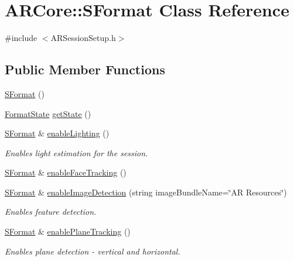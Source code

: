 \hypertarget{class_a_r_core_1_1_s_format}{}\section{A\+R\+Core\+:\+:S\+Format Class Reference}
\label{class_a_r_core_1_1_s_format}


{\ttfamily \#include $<$A\+R\+Session\+Setup.\+h$>$}

\subsection*{Public Member Functions}
\begin{DoxyCompactItemize}
\item 
\mbox{\hyperlink{class_a_r_core_1_1_s_format_ae73326e3801cb8a94ef235acf1b6ea0a}{S\+Format}} ()
\item 
\mbox{\hyperlink{struct_a_r_core_1_1_format_state}{Format\+State}} \mbox{\hyperlink{class_a_r_core_1_1_s_format_a99e7aa08fc727c1f45a6a2277b5764fb}{get\+State}} ()
\item 
\mbox{\hyperlink{class_a_r_core_1_1_s_format}{S\+Format}} \& \mbox{\hyperlink{class_a_r_core_1_1_s_format_a3e4a19abf7ccdb7911148dcbc016e08d}{enable\+Lighting}} ()
\begin{DoxyCompactList}\small\item\em Enables light estimation for the session. \end{DoxyCompactList}\item 
\mbox{\hyperlink{class_a_r_core_1_1_s_format}{S\+Format}} \& \mbox{\hyperlink{class_a_r_core_1_1_s_format_ae7a325750d00b407e35531f4ea2acf1f}{enable\+Face\+Tracking}} ()
\item 
\mbox{\hyperlink{class_a_r_core_1_1_s_format}{S\+Format}} \& \mbox{\hyperlink{class_a_r_core_1_1_s_format_a3346614171dc017dda8adc8cf0823daa}{enable\+Image\+Detection}} (string image\+Bundle\+Name=\char`\"{}AR Resources\char`\"{})
\begin{DoxyCompactList}\small\item\em Enables feature detection. \end{DoxyCompactList}\item 
\mbox{\hyperlink{class_a_r_core_1_1_s_format}{S\+Format}} \& \mbox{\hyperlink{class_a_r_core_1_1_s_format_a645b86ef5095920838f8a826ae77ced1}{enable\+Plane\+Tracking}} ()
\begin{DoxyCompactList}\small\item\em Enables plane detection -\/ vertical and horizontal. \end{DoxyCompactList}\item 

\end{DoxyCompactItemize}
